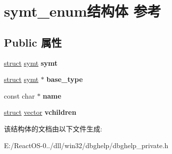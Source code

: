 \hypertarget{structsymt__enum}{}\section{symt\+\_\+enum结构体 参考}
\label{structsymt__enum}
\subsection*{Public 属性}
\begin{DoxyCompactItemize}
\item 
\mbox{\label{structsymt__enum_a5dd74d9be2e98709e1d62d58ff4facc6}} 
\hyperlink{interfacestruct}{struct} \hyperlink{structsymt}{symt} {\bfseries symt}
\item 
\mbox{\label{structsymt__enum_a94ce76a32556ac9fbbdf5f9a3efa53e6}} 
\hyperlink{interfacestruct}{struct} \hyperlink{structsymt}{symt} $\ast$ {\bfseries base\+\_\+type}
\item 
\mbox{\label{structsymt__enum_a711bb5c4d02b653674dfbc83d8af7696}} 
const char $\ast$ {\bfseries name}
\item 
\mbox{\label{structsymt__enum_afbd076fae2ba5a1d6c3564147899f705}} 
\hyperlink{interfacestruct}{struct} \hyperlink{structvector}{vector} {\bfseries vchildren}
\end{DoxyCompactItemize}


该结构体的文档由以下文件生成\+:\begin{DoxyCompactItemize}
\item 
E\+:/\+React\+O\+S-\/0../dll/win32/dbghelp/dbghelp\+\_\+private.\+h\end{DoxyCompactItemize}
